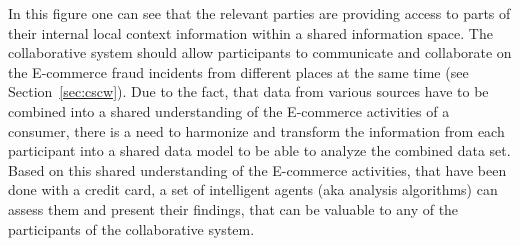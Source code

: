 In this figure one can see that the relevant parties are providing access to parts of their internal local context information within a shared information space. The collaborative system should allow participants to communicate and collaborate on the \gls{E-commerce} fraud incidents from different places at the same time (see Section~\ref{sec:cscw}). Due to the fact, that data from various sources have to be combined into a shared understanding of the \gls{E-commerce} activities of a consumer, there is a need to harmonize and transform the information from each participant into a shared data model to be able to analyze the combined data set. Based on this shared understanding of the \gls{E-commerce} activities, that have been done with a credit card, a set of intelligent agents (aka analysis algorithms) can assess them and present their findings, that can be valuable to any of the participants of the collaborative system.

